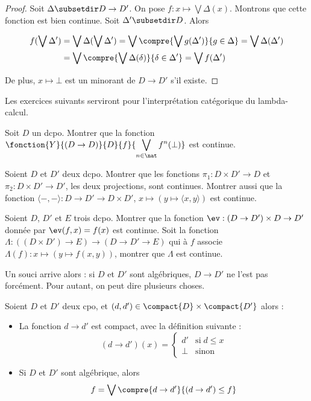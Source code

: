 \begin{proof}
    Soit $\Delta\subsetdir D\to D'$. On pose $f : x \mapsto \bigvee \Delta(x)$. Montrons que cette fonction est bien continue. Soit $\Delta'\subsetdir D$. Alors 
    \begin{center}
        \begin{align*}
            f(\bigvee\Delta') &= \bigvee\Delta(\bigvee \Delta') = \bigvee\compre{\bigvee g(\Delta')}{g\in\Delta}=\bigvee\Delta(\Delta')\\
            &= \bigvee\compre{\bigvee \Delta(\delta)}{\delta\in\Delta'}=\bigvee f(\Delta')
        \end{align*}
    \end{center}
    
    De plus, $x\mapsto \bot$ est un minorant de $D\to D'$ s'il existe.
\end{proof}

Les exercices suivants serviront pour l'interprétation catégorique du lambda-calcul.

\begin{exo}
    Soit $D$ un dcpo. Montrer que la fonction $\fonction{Y}{(D\to D)}{D}{f}{\displaystyle{\bigvee_{n\in\nat}f^n(\bot)}}$ est continue.
\end{exo}

\begin{exo}
    Soient $D$ et $D'$ deux dcpo. Montrer que les fonctions $\pi_1 : D\times D' \to D$ et $\pi_2 : D\times D' \to D'$, les deux projections, sont continues. Montrer aussi que la fonction $\langle -,-\rangle : D\to D'\to D\times D'$, $x\mapsto (y\mapsto \langle x,y\rangle)$ est continue.
\end{exo}

\begin{exo}
    Soient $D$, $D'$ et $E$ trois dcpo. Montrer que la fonction $\ev : (D\to D')\times D \to D'$ donnée par $\ev (f,x)=f(x)$ est continue. Soit la fonction $\Lambda : ((D\times D')\to E)\to (D\to D'\to E)$ qui à $f$ associe $\Lambda(f) : x \mapsto (y\mapsto f(x,y))$, montrer que $\Lambda$ est continue.
\end{exo}

Un souci arrive alors : si $D$ et $D'$ sont algébriques, $D\to D'$ ne l'est pas forcément. Pour autant, on peut dire plusieurs choses.

\begin{prop}
    Soient $D$ et $D'$ deux cpo, et $(d,d')\in\compact{D}\times\compact{D'}$ alors :
    \begin{itemize}[label=$\bullet$]
        \item La fonction $d\to d'$ est compact, avec la définition suivante :
        $$(d\to d')(x)=\left\{\begin{array}{cl}
            d' & \mathrm{si}\; d\leq x \\
            \bot & \mathrm{sinon}
        \end{array}\right.$$
        \item Si $D$ et $D'$ sont algébrique, alors $$f=\bigvee\compre{d\to d'}{(d\to d')\leq f}$$
    \end{itemize}
\end{prop}

